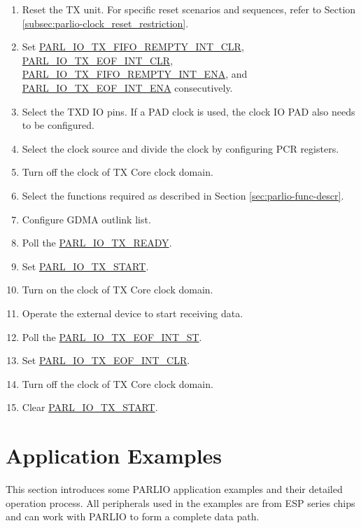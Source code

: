 \documentclass[main\_\_EN.tex]{subfiles}
\begin{document}
\begin{enumerate}
    \item Reset the TX unit. For specific reset scenarios and sequences, refer to Section \ref{subsec:parlio-clock_reset_restriction}.
    \item Set \hyperref[fielddesc:PARLIOTXFIFOREMPTYINTCLR]{PARL\_IO\_TX\_FIFO\_REMPTY\_INT\_CLR}, \hyperref[fielddesc:PARLIOTXEOFINTCLR]{PARL\_IO\_TX\_EOF\_INT\_CLR}, \hyperref[fielddesc:PARLIOTXFIFOREMPTYINTENA]{PARL\_IO\_TX\_FIFO\_REMPTY\_INT\_ENA}, and \hyperref[fielddesc:PARLIOTXEOFINTENA]{PARL\_IO\_TX\_EOF\_INT\_ENA} consecutively. 
    \item Select the TXD IO pins. If a PAD clock is used, the clock IO PAD also needs to be configured. 
    \item Select the clock source and  divide the clock by configuring PCR registers.
    \item Turn off the clock of TX Core clock domain.
    \item Select the functions required as described in Section \ref{sec:parlio-func-descr}.
    \item Configure GDMA outlink list.
    \item Poll the \hyperref[fielddesc:PARLIOTXREADY]{PARL\_IO\_TX\_READY}.
    \item Set \hyperref[fielddesc:PARLIOTXSTART]{PARL\_IO\_TX\_START}.
    \item Turn on the clock of TX Core clock domain.
    \item Operate the external device to start receiving data.
    \item Poll the \hyperref[fielddesc:PARLIOTXEOFINTST]{PARL\_IO\_TX\_EOF\_INT\_ST}.
    \item Set \hyperref[fielddesc:PARLIOTXEOFINTCLR]{PARL\_IO\_TX\_EOF\_INT\_CLR}.
    \item Turn off the clock of TX Core clock domain.
    \item Clear \hyperref[fielddesc:PARLIOTXSTART]{PARL\_IO\_TX\_START}.
\end{enumerate}


\section{Application Examples}
\label{sec:parlio-application-example}
This section introduces some PARLIO application examples and their detailed operation process. All peripherals used in the examples are from ESP series chips and can work with PARLIO to form a complete data path. 
\end{document}
